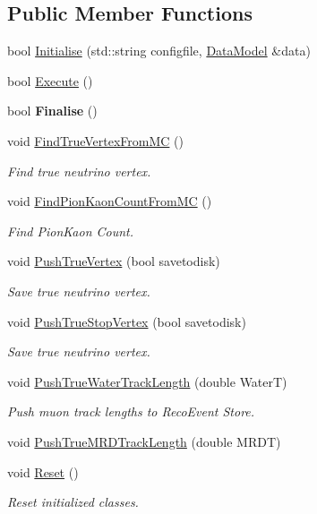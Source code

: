 \subsection*{Public Member Functions}
\begin{DoxyCompactItemize}
\item 
bool \hyperlink{classMCRecoEventLoader_a3c57d089982246d613d553092ab8f141}{Initialise} (std\-::string configfile, \hyperlink{classDataModel}{Data\-Model} \&data)
\item 
bool \hyperlink{classMCRecoEventLoader_a17027f8a3689b459fa54a4a3c84b5a0c}{Execute} ()
\item 
\hypertarget{classMCRecoEventLoader_ac4b21a91ed4795b7ffc9695ec38438e2}{bool {\bfseries Finalise} ()}\label{classMCRecoEventLoader_ac4b21a91ed4795b7ffc9695ec38438e2}

\item 
void \hyperlink{classMCRecoEventLoader_a981fbf41206f4be37c40ec5fbaeb9c9d}{Find\-True\-Vertex\-From\-M\-C} ()
\begin{DoxyCompactList}\small\item\em Find true neutrino vertex. \end{DoxyCompactList}\item 
void \hyperlink{classMCRecoEventLoader_ade2e70b075295f19384e6862dda123ec}{Find\-Pion\-Kaon\-Count\-From\-M\-C} ()
\begin{DoxyCompactList}\small\item\em Find Pion\-Kaon Count. \end{DoxyCompactList}\item 
void \hyperlink{classMCRecoEventLoader_a4d3d3f6e9b15bd07420b0b10f04eed11}{Push\-True\-Vertex} (bool savetodisk)
\begin{DoxyCompactList}\small\item\em Save true neutrino vertex. \end{DoxyCompactList}\item 
void \hyperlink{classMCRecoEventLoader_a57ec5fa238eed8885465bf6d3e03078c}{Push\-True\-Stop\-Vertex} (bool savetodisk)
\begin{DoxyCompactList}\small\item\em Save true neutrino vertex. \end{DoxyCompactList}\item 
void \hyperlink{classMCRecoEventLoader_a79a348512d9c7fb13aa86e96d5f1d39b}{Push\-True\-Water\-Track\-Length} (double Water\-T)
\begin{DoxyCompactList}\small\item\em Push muon track lengths to Reco\-Event Store. \end{DoxyCompactList}\item 
void \hyperlink{classMCRecoEventLoader_a258d351d5afce9a2be153db10a80ae3a}{Push\-True\-M\-R\-D\-Track\-Length} (double M\-R\-D\-T)
\item 
void \hyperlink{classMCRecoEventLoader_a1c01acb2c109e46de4e1dc27911843c3}{Reset} ()
\begin{DoxyCompactList}\small\item\em Reset initialized classes. \end{DoxyCompactList}\end{DoxyCompactItemize}
